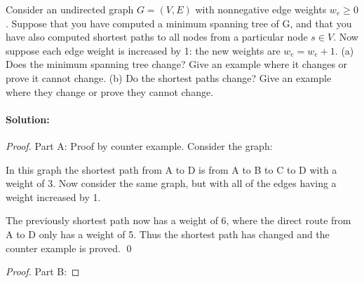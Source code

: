 \documentclass[12pt]{article}
\begin{document}
Consider an undirected graph $G = (V, E)$ with nonnegative edge weights $ w_e \ge 0$. Suppose that
you have computed a minimum spanning tree of G, and that you have also computed shortest
paths to all nodes from a particular node $s \in V$.
Now suppose each edge weight is increased by 1: the new weights are $w_e = w_e + 1$.
(a) Does the minimum spanning tree change? Give an example where it changes or prove it
cannot change.
(b) Do the shortest paths change? Give an example where they change or prove they cannot
change.
\paragraph{Solution:}
\begin{proof}
Part A:  Proof by counter example.
Consider the graph:

In this graph the shortest path from A to D is from A to B to C to D with a weight of 3.
Now consider the same graph, but with all of the edges having a weight increased by 1.

The previously shortest path now has a weight of 6, where the direct route from A to D only has a weight of 5.  Thus the shortest path has changed and the counter example is proved.  \qed
\end{proof}
\begin{proof}
Part B:
\end{proof}
\end{document}
